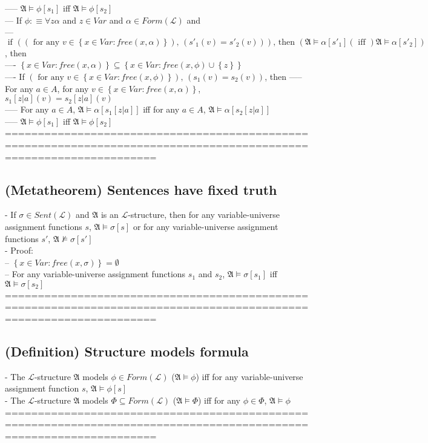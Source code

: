\documentclass{book}
\newcommand{\is}{:\equiv}
\newcommand{\inot}{\not}
\newcommand{\txtiff}{\left(\text{ iff }\right)}
\newcommand{\txtforall}[2]{\left(\text{ for any }#1\right)\text{, }\left(#2\right)}
\newcommand{\txtif}[2]{\text{ if }\left(#1\right)\text{, then }\left(#2\right)}
\newcommand{\free}[2]{free(#1, #2)}
\newcommand{\set}[1]{\left\{ #1 \right\}}
\begin{document}
					----- $\mathfrak{A} \vDash \phi[s_1]$ iff $\mathfrak{A} \vDash \phi[s_2]$ \\
			--- If $\phi \is \forall z \alpha$ and $z \in Var$ and $\alpha \in Form(\mathcal{L})$ and \\
			--- $\txtif{\txtforall{v \in \set{x \in Var: \free{x}{\alpha}}}{s'_1(v) = s'_2(v)}}{\mathfrak{A} \vDash \alpha[s'_1] \txtiff \mathfrak{A} \vDash \alpha[s'_2]}$, then \\
				---- $\set{x \in Var: \free{x}{\alpha}} \subseteq \set{x \in Var: \free{x}{\phi} \cup \set{z}}$ \\
				---- If $\txtforall{v \in \set{x \in Var: \free{x}{\phi}}}{s_1(v) = s_2(v)}$, then 
					----- For any $a \in A$, for any $v \in \set{x \in Var: \free{x}{\alpha}}$, $s_1[z|a](v) = s_2[z|a](v)$ \\
					----- For any $a \in A$, $\mathfrak{A} \vDash \alpha[s_1[z|a]]$ iff for any $a \in A$, $\mathfrak{A} \vDash \alpha[s_2[z|a]]$ \\ %
					----- $\mathfrak{A} \vDash \phi[s_1]$ iff $\mathfrak{A} \vDash \phi[s_2]$ \\
	===================================================================================================================
\subsection{(Metatheorem) Sentences have fixed truth} %
	- If $\sigma \in Sent(\mathcal{L})$ and $\mathfrak{A}$ is an $\mathcal{L}$-structure, then for any variable-universe assignment functions $s$, $\mathfrak{A} \vDash \sigma[s]$ or for any variable-universe assignment functions $s'$, $\mathfrak{A} \inot \vDash \sigma[s']$ \\
	- Proof: \\
		-- $\set{x \in Var: \free{x}{\sigma}} = \emptyset$ \\
		-- For any variable-universe assignment functions $s_1$ and $s_2$, $\mathfrak{A} \vDash \sigma[s_1]$ iff $\mathfrak{A} \vDash \sigma[s_2]$ \\
	===================================================================================================================
\subsection{(Definition) Structure models formula} %
	- The $\mathcal{L}$-structure $\mathfrak{A}$ models $\phi \in Form(\mathcal{L})$ ($\mathfrak{A} \vDash \phi$) iff for any variable-universe assignment function $s$, $\mathfrak{A} \vDash \phi[s]$ \\
	- The $\mathcal{L}$-structure $\mathfrak{A}$ models $\Phi \subseteq Form(\mathcal{L})$ ($\mathfrak{A} \vDash \Phi$) iff for any $\phi \in \Phi$, $\mathfrak{A} \vDash \phi$ \\
	===================================================================================================================
\end{document}
